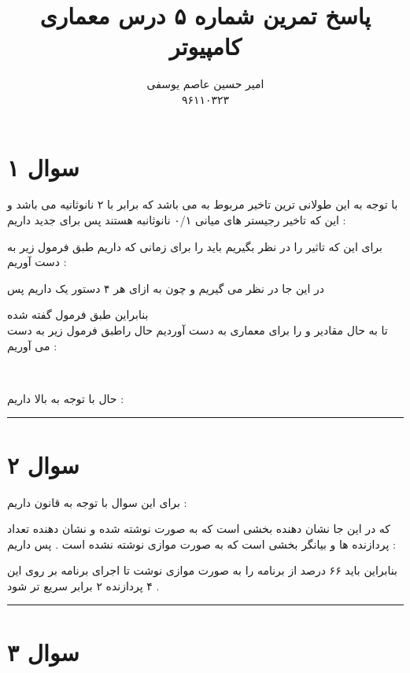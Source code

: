 \documentclass{article}
\title{پاسخ تمرین شماره ۵ درس معماری کامپیوتر }
\author{امیر حسین عاصم یوسفی \\ ۹۶۱۱۰۳۲۳}
\begin{document}
	\maketitle
	
\section*{سوال ۱}
با توجه به این طولانی ترین تاخیر مربوط به 
می باشد که برابر با ۲ نانوثانیه می باشد و این که تاخیر رجیستر های میانی ۰/۱ نانوثانبه هستند پس برای 
جدید داریم  : 
\begin{center}
\end{center}
برای این که تاثیر
را در نظر بگیریم باید 
را برای زمانی که 
داریم طبق فرمول زیر به دست آوریم : 
\begin{center}
\end{center}
در این جا 
در نظر می گیریم و چون به ازای هر ۴ دستور یک 
داریم پس 
\begin{center}
\end{center}
بنابراین طبق فرمول گفته شده 
\textcolor{red}{}\\
تا به حال مقادیر 
و 
را برای معماری 
به دست آوردیم حال  
راطبق فرمول زیر به دست می آوریم  : 
\begin{center}
 \\
\end{center}
حال با توجه به بالا داریم  : 
\begin{center}
\end{center}
\hrule
\section*{سوال ۲}
برای این سوال با توجه به قانون 
داریم  : 
\begin{center}
\end{center}
که در این جا 
نشان دهنده بخشی است که به صورت 
نوشته شده و 
نشان دهنده تعداد پردازنده ها و 
بیانگر بخشی است که به صورت موازی نوشته نشده است . پس داریم  : 
\begin{center}
\end{center}
بنابراین باید ۶۶ درصد از برنامه را به صورت موازی نوشت تا اجرای برنامه بر روی این ۴ پردازنده ۲ برابر سریع تر شود  . 
\hrule
\section*{سوال ۳ }
\end{document}
